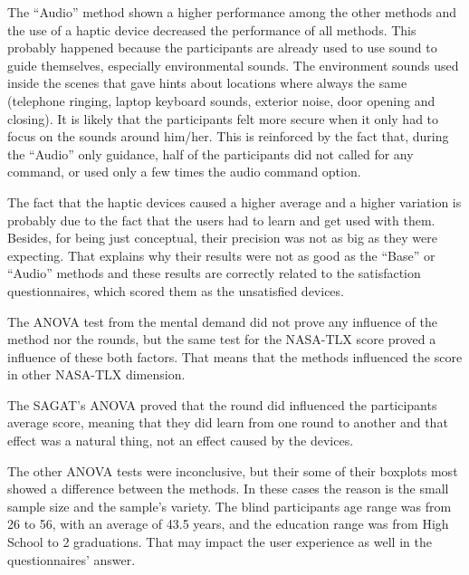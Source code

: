 


The “Audio” method shown a higher performance among the other methods and the use of a haptic device decreased the performance of all methods. This probably happened because the participants are already used to use sound to guide themselves, especially environmental sounds. The environment sounds used inside the scenes that gave hints about locations where always the same (telephone ringing, laptop keyboard sounds, exterior noise, door opening and closing). It is likely that the participants felt more secure when it only had to focus on the sounds around him/her. This is reinforced by the fact that, during the “Audio” only guidance, half of the participants did not called for any command, or used only a few times the audio command option.

The fact that the haptic devices caused a higher average and a higher variation is probably due to the fact that the users had to learn and get used with them. Besides, for being just conceptual, their precision was not as big as they were expecting. That explains why their results were not as good as the “Base” or “Audio” methods and these results are correctly related to the satisfaction questionnaires, which scored them as the unsatisfied devices.

The ANOVA test from the mental demand did not prove any influence of the method nor the rounds, but the same test for the NASA-TLX score proved a influence of these both factors. That means that the methods influenced the score in other NASA-TLX dimension.

The SAGAT's ANOVA proved that the round did influenced the participants average score, meaning that they did learn from one round to another and that effect was a natural thing, not an effect caused by the devices.

The other ANOVA tests were inconclusive, but their some of their boxplots most showed a difference between the methods. In these cases the reason is the small sample size and the sample’s variety. The blind participants age range was from 26 to 56, with an average of 43.5 years, and the education range was from High School to 2 graduations. That may impact the user experience as well in the questionnaires' answer.

